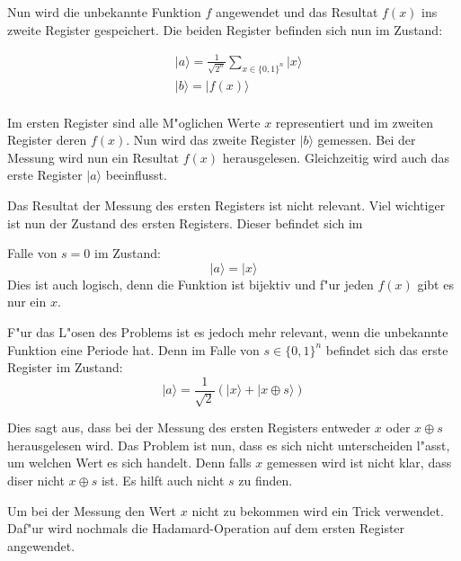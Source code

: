 \begin{refsection}
Nun wird die unbekannte Funktion $f$ angewendet und das Resultat $f(x)$ ins
zweite Register gespeichert. Die beiden Register befinden sich nun im Zustand:

\begin{align*}
  & |a\rangle = \frac{1}{\sqrt{2^n}} \sum_{x\in\{0,1\}^n} {|x\rangle} \\
  & |b\rangle = |f(x)\rangle \\
\end{align*}

Im ersten Register sind alle M"oglichen Werte $x$ representiert und im zweiten
Register deren $f(x)$. Nun wird das zweite Register $|b\rangle$ gemessen. Bei
der Messung wird nun ein Resultat $f(x)$ herausgelesen. Gleichzeitig wird auch
das erste Register $|a\rangle$ beeinflusst.

Das Resultat der Messung des ersten Registers ist nicht relevant. Viel
wichtiger ist nun der Zustand des ersten Registers. Dieser befindet sich im

Falle von $s = 0$ im Zustand:
\[
    |a\rangle = |x\rangle
\]
Dies ist auch logisch, denn die Funktion ist bijektiv und f"ur jeden $f(x)$
gibt es nur ein $x$. %

F"ur das L"osen des Problems ist es jedoch mehr relevant, wenn die unbekannte
Funktion eine Periode hat. Denn im Falle von $s \in \{0,1\}^n$ befindet sich
das erste Register im Zustand:
\[
    |a\rangle = \frac{1}{\sqrt{2}} ( |x\rangle + |x \oplus s \rangle )
\]

Dies sagt aus, dass bei der Messung des ersten Registers entweder $x$ oder $x
\oplus s$ herausgelesen wird. Das Problem ist nun, dass es sich nicht
unterscheiden l"asst, um welchen Wert es sich handelt. Denn falls $x$ gemessen
wird ist nicht klar, dass diser nicht $x \oplus s$ ist. Es hilft auch nicht
$s$ zu finden.

Um bei der Messung den Wert $x$ nicht zu bekommen wird ein Trick verwendet.
Daf"ur wird nochmals die Hadamard-Operation auf dem ersten Register angewendet.


\end{refsection}

